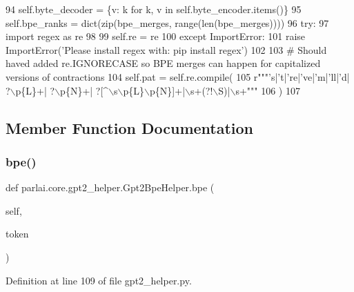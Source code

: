 \begin{DoxyCode}
94         self.byte\_decoder = \{v: k \textcolor{keywordflow}{for} k, v \textcolor{keywordflow}{in} self.byte\_encoder.items()\}
95         self.bpe\_ranks = dict(zip(bpe\_merges, range(len(bpe\_merges))))
96         \textcolor{keywordflow}{try}:
97             \textcolor{keyword}{import} regex \textcolor{keyword}{as} re
98 
99             self.re = re
100         \textcolor{keywordflow}{except} ImportError:
101             \textcolor{keywordflow}{raise} ImportError(\textcolor{stringliteral}{'Please install regex with: pip install regex'})
102 
103         \textcolor{comment}{# Should haved added re.IGNORECASE so BPE merges can happen for capitalized versions of
       contractions}
104         self.pat = self.re.compile(
105             \textcolor{stringliteral}{r"""'s|'t|'re|'ve|'m|'ll|'d| ?\(\backslash\)p\{L\}+| ?\(\backslash\)p\{N\}+| ?[^\(\backslash\)s\(\backslash\)p\{L\}\(\backslash\)p\{N\}]+|\(\backslash\)s+(?!\(\backslash\)S)|\(\backslash\)s+"""}
106         )
107 
\end{DoxyCode}


\subsection{Member Function Documentation}
\mbox{\label{classparlai_1_1core_1_1gpt2__helper_1_1Gpt2BpeHelper_a4cbde811e48261fb369a87e68cd138cc}} 
\subsubsection{\texorpdfstring{bpe()}{bpe()}}
{\footnotesize\ttfamily def parlai.\+core.\+gpt2\+\_\+helper.\+Gpt2\+Bpe\+Helper.\+bpe (\begin{DoxyParamCaption}\item[{}]{self,  }\item[{}]{token }\end{DoxyParamCaption})}



Definition at line 109 of file gpt2\+\_\+helper.\+py.


